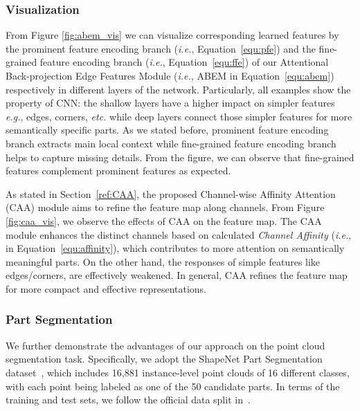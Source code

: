\documentclass[journal,twoside]{IEEEtran}
\newcommand{\latinphrase}[1]{\textit{#1}}
\newcommand{\ie}{\latinphrase{i.e.}\xspace}
\newcommand{\eg}{\latinphrase{e.g.}\xspace}
\newcommand{\etc}{\latinphrase{etc.}\xspace}
\begin{document}
\subsubsection{Visualization}
From Figure \ref{fig:abem_vis} we can visualize corresponding learned features by the prominent feature encoding branch (\ie, Equation~\ref{equ:pfe}) and the fine-grained feature encoding branch (\ie, Equation~\ref{equ:ffe}) of our Attentional Back-projection Edge Features Module (\ie, ABEM in Equation~\ref{equ:abem}) respectively in different layers of the network. Particularly, all examples show the property of CNN: the shallow layers have a higher impact on simpler features \eg, edges, corners, \etc while deep layers connect those simpler features for more semantically specific parts. As we stated before, prominent feature encoding branch extracts main local context while fine-grained feature encoding branch helps to capture missing details. From the figure, we can observe that fine-grained features complement prominent features as expected.

As stated in Section~\ref{ref:CAA}, the proposed Channel-wise Affinity Attention (CAA) module aims to refine the feature map along channels. From Figure \ref{fig:caa_vis}, we observe the effects of CAA on the feature map. The CAA module enhances the distinct channels based on calculated \emph{ Channel Affinity} (\ie,  in Equation~\ref{equ:affinity}), which contributes to more attention on semantically meaningful parts. On the other hand, the responses of simple features like edges/corners, are effectively weakened. In general, CAA refines the feature map for more compact and effective representations.

\subsubsection{Part Segmentation}
We further demonstrate the advantages of our approach on the point cloud segmentation task. Specifically, we adopt the ShapeNet Part Segmentation dataset~\cite{yi2016scalable}, which includes 16,881 instance-level point clouds of 16 different classes, with each point being labeled as one of the 50 candidate parts. In terms of the training and test sets, we follow the official data split in~\cite{chang2015shapenet}. 
\end{document}
